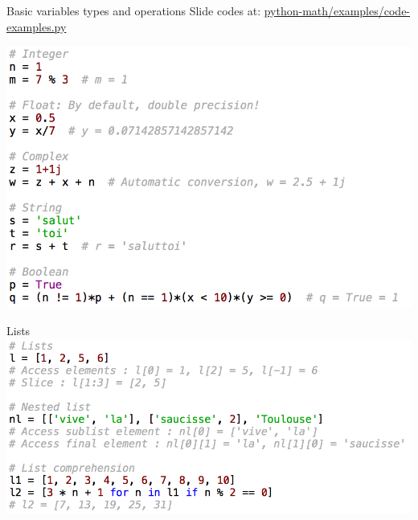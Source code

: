 \documentclass[11pt,unknownkeysallowed,usenames,dvipsnames]{beamer}
\begin{document}
    
%       
%    
%    
%    
%    
%        
\begin{frame}{Basic variables types and operations}
    Slide codes at: 
    \href{https://gitlab.unige.ch/Thibaut.Lunet/python-math/tree/master/examples/code-examples}{python-math/examples/code-examples.py}
    
    \vspace*{5pt}
    \includegraphics[width=0.9\linewidth]{code-basic-variables}
\end{frame}



%    
%    
\begin{frame}{Lists}
    \includegraphics[width=0.9\linewidth]{code-lists}
\end{frame}
\end{document}
